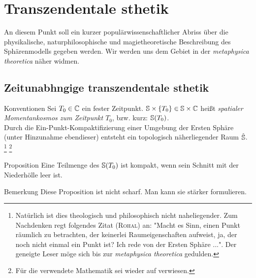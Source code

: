 \section[tocentry=Transzendentale Ästhetik, head=Transzendentale Ästhetik]{Transzendentale \Aech sthetik}
An diesem Punkt soll ein kurzer populärwissenschaftlicher Abriss über die physikalische, naturphilosophische und magietheoretische Beschreibung des Sphärenmodells gegeben werden. Wir werden uns dem Gebiet in der \emph{metaphysica theoretica} näher widmen.\\
\subsection[tocentry=Zeitunabhängige transzendentale Ästhetik, head=Zeitunabhängige transzendentale Ästhetik]{Zeitunabh\aech ngige transzendentale \Aech sthetik}
\begin{bla}{Konventionen}
Sei $T_0 \in \mathbb{C}$ ein fester Zeitpunkt. $\mathbb{S} \times \{T_0\} \in \mathbb{S} \times \mathbb{C}$ heißt \emph{spatialer Momentankosmos zum Zeitpunkt $T_0$}, bzw. kurz: $\mathbb{S} (T_0)$.\\
Durch die Ein-Punkt-Kompaktifizierung einer Umgebung der Ersten Sphäre (unter Hinzunahme ebendieser) entsteht ein topologisch näherliegender Raum $\hat{\mathbb{S}}$.
\footnote{Natürlich ist dies theologisch und philosophisch nicht naheliegender. Zum Nachdenken regt folgendes Zitat (\textsc{Rohal}) an: "Macht es Sinn, einen Punkt räumlich zu betrachten, der keinerlei Raumeigenschaften aufweist, ja, der noch nicht einmal ein Punkt ist? Ich rede von der Ersten Sphäre ...". Der geneigte Leser möge sich bis zur \emph{metaphysica theoretica} gedulden.}
\footnote{Für die verwendete Mathematik sei wieder auf \cite{erzzwerge} verwiesen.}
\end{bla}
\begin{bla}{Proposition}
Eine Teilmenge des $\mathbb{S} (T_0)$ ist kompakt, wenn sein Schnitt mit der Niederhölle leer ist. 
\end{bla}
\begin{bla}{Bemerkung}
Diese Proposition ist nicht scharf. Man kann sie stärker formulieren.
\end{bla}